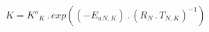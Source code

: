 \documentclass[border=1pt]{standalone}
\begin{document}
$K={K^o}{_{K}} \, . \, exp(\left( -{E_a}{_{N, K}} \right) \, . \, \left( {R}{_{N}} \, . \, {T}{_{N, K}} \right)^{-1})$
\end{document}
